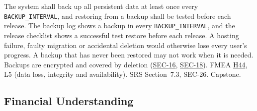 \documentclass{article}
\newcommand{\reqref}[1]{\hyperref[req:#1]{#1}}
\newcommand{\hazref}[1]{\hyperref[#1]{#1}}
\begin{document}
\begin{description}
{The system shall back up all persistent data at least once every
\texttt{BACKUP\_INTERVAL}, and restoring from a backup shall be tested before
each release.}
{The backup log shows a backup in every \texttt{BACKUP\_INTERVAL}, and the
release checklist shows a successful test restore before each release.}
{A hosting failure, faulty migration or accidental deletion would otherwise
lose every user's progress. A backup that has never been restored may not
work when it is needed. Backups are encrypted and covered by deletion
(\reqref{SEC-16}, \reqref{SEC-18}).}
{FMEA \hazref{H44}, L5 (data loss, integrity and availability).}
{SRS Section~7.3, SEC-26.}
{Capstone.}

\end{description}

\subsection{Financial Understanding}
\end{document}
